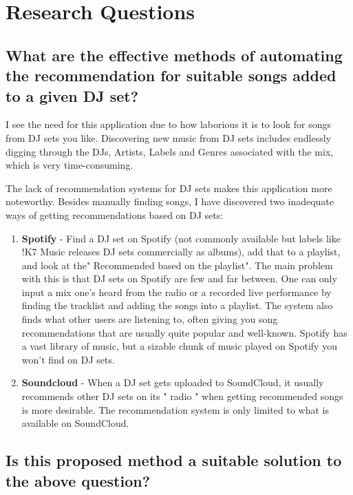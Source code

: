 \documentclass[]{article}
\begin{document}
	
\section{Research Questions}
	\subsection{What are the effective methods of automating the recommendation for suitable songs added to a given DJ set?}
	
	I see the need for this application due to how laborious it is to look for songs from DJ sets you like. Discovering new music from DJ sets includes endlessly digging through the DJs, Artists, Labels and Genres associated with the mix, which is very time-consuming. 
	
	\begin{flushleft}
		The lack of recommendation systems for DJ sets makes this application more noteworthy. Besides manually finding songs, I have discovered two inadequate ways of getting recommendations based on DJ sets:
	\end{flushleft}
	
	\begin{enumerate}
		
		\item \textbf{Spotify }- Find a DJ set on Spotify (not commonly available but labels like !K7 Music releases DJ sets commercially as albums), add that to a playlist, and look at the" Recommended based on the playlist". The main problem with this is that DJ sets on Spotify are few and far between. One can only input a mix one's heard from the radio or a recorded live performance by finding the tracklist and adding the songs into a playlist. The system also finds what other users are listening to, often giving you song recommendations that are usually quite popular and well-known. Spotify has a vast library of music, but a sizable chunk of music played on Spotify you won't find on DJ sets. 
		
		\item \textbf{Soundcloud }- When a DJ set gets uploaded to SoundCloud, it usually recommends other DJ sets on its " radio " when getting recommended songs is more desirable. The recommendation system is only limited to what is available on SoundCloud.
	\end{enumerate}

	\subsection{Is this proposed method a suitable solution to the above question?}
	
\end{document}
